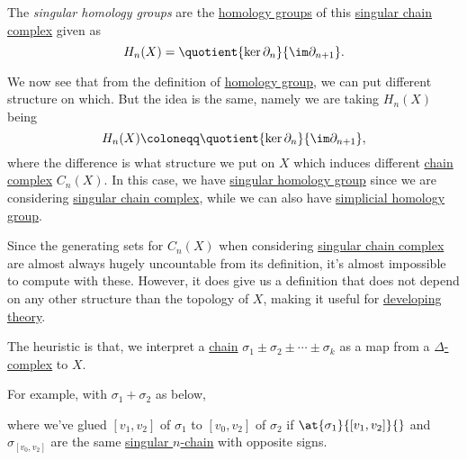 \begin{definition}\label{def:singular-homology-group}
	The \emph{singular homology groups} are the \hyperref[def:homology-group]{homology groups} of this \hyperref[def:singular-chain]{singular chain complex} given as
	\[
		H_n(X) = \quotient{\ker \partial_n}{\im \partial_{n + 1}}.
	\]
\end{definition}
\begin{remark}
	We now see that from the definition of \hyperref[def:homology-group]{homology group}, we can put different structure on which.
	But the idea is the same, namely we are taking \(H_{n} (X)\) being
	\[
		H_n(X) \coloneqq \quotient{\ker \partial _n}{\im \partial _{n+1}},
	\]
	where the difference is what structure we put on \(X\) which induces different \hyperref[def:chain-complex]{chain complex} \(C_{n} (X)\).
	In this case, we have \hyperref[def:singular-homology-group]{singular homology group} since we are considering
	\hyperref[def:singular-chain-complex]{singular chain complex}, while we can also have
	\hyperref[def:simplicial-homology-group]{simplicial homology group}.
\end{remark}

\hr
Since the generating sets for \(C_{n} (X)\) when considering \hyperref[def:singular-chain-complex]{singular chain complex} are almost
always hugely uncountable from its definition, it's almost impossible to compute with these. However, it does give us a definition
that does not depend on any other structure than the topology of \(X\), making it useful for \underline{developing theory}.

\begin{note}
	The heuristic is that, we interpret a \hyperref[def:chain-complex]{chain} \(\sigma_1 \pm \sigma_2 \pm \cdots \pm \sigma_k\) as a
	map from a \hyperref[def:delta-complex]{\(\Delta\)-complex} to \(X\).

	\par For example, with \(\sigma_1 + \sigma_2\) as below,
	\begin{figure}[H]
		\centering
		\label{fig:note:chain-as-a-map}
	\end{figure}
	where we've glued \([v_1, v_2]\) of \(\sigma_1\) to \([v_0, v_2]\) of \(\sigma_2\) if \(\at{\sigma_1}{[v_1, v_2]}{}\) and
	\(\sigma_{[v_0, v_2]}\) are the same \hyperref[def:singular-chain]{singular \(n\)-chain} with opposite signs.
\end{note}

\hr

